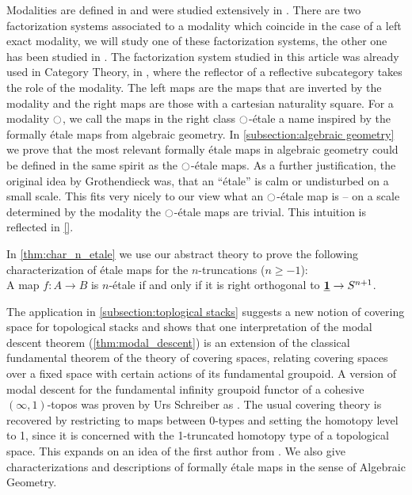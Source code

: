 \documentclass[9pt,twosided]{amsart}
\begin{document}
Modalities are defined in \cite[Section 7.7]{UFP} and were studied extensively in \cite{RijkeSpittersShulman}.
There are two factorization systems associated to a modality which coincide in the case of a left exact modality,
we will study one of these factorization systems, the other one has been studied in \cite{RijkeSpittersShulman}.
The factorization system studied in this article was already used in Category Theory, in \cite{cassidy_hebert_kelly_1985}, where the reflector of a reflective subcategory takes the role of the modality.
The left maps are the maps that are inverted by the modality and the right maps are those with a cartesian naturality square.
For a modality ${\ocircle}$, we call the maps in the right class ${\ocircle}$-étale a name inspired by the formally étale maps from algebraic geometry.
In \ref{subsection:algebraic geometry} we prove that the most relevant formally étale maps in algebraic geometry could be defined in the same spirit as the ${\ocircle}$-étale maps.
As a further justification, the original idea by Grothendieck was, that an ``étale'' is calm or undisturbed on a small scale.
This fits very nicely to our view what an ${\ocircle}$-étale map is -- on a scale determined by the modality the ${\ocircle}$-étale maps are trivial.
This intuition is reflected in \ref{}.

In \cref{thm:char_n_etale} we use our abstract theory to prove the following characterization of étale maps for the $n$-truncations ($n\geq -1$): \\
A map $f:A\to B$ is $n$-\'etale if and only if it is right orthogonal to $\underline{\mathbf{1}}\to S^{n+1}$.

The application in \cref{subsection:toplogical stacks} suggests a new notion of covering space for topological stacks and shows that
one interpretation of the modal descent theorem (\cref{thm:modal_descent}) is an extension of the classical fundamental theorem of the theory of covering spaces,
relating covering spaces over a fixed space with certain actions of its fundamental groupoid.
A version of modal descent for the fundamental infinity groupoid functor of a cohesive $(\infty,1)$-topos was proven by Urs Schreiber as \cite[Proposition 5.2.42]{SchreiberDcct}.
The usual covering theory is recovered by restricting to maps between 0-types and setting the homotopy level to 1,
since it is concerned with the 1-truncated homotopy type of a topological space.
This expands on an idea of the first author from \cite{wellen-oxford-abstract}.
We also give characterizations and descriptions of formally étale maps in the sense of Algebraic Geometry.
  
\end{document}
